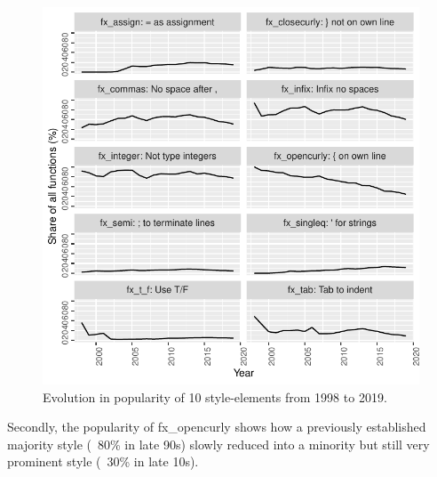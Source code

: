 \begin{figure}[htbp]
  \centering
  \includegraphics{fig1}
  \caption{Evolution in popularity of 10 style-elements from 1998 to 2019.}
  \label{figure:fig1}
\end{figure}


Secondly, the popularity of fx\_opencurly shows how a previously established majority style (~80\% in late 90s) slowly reduced into a minority but still very prominent style (~30\% in late 10s).

